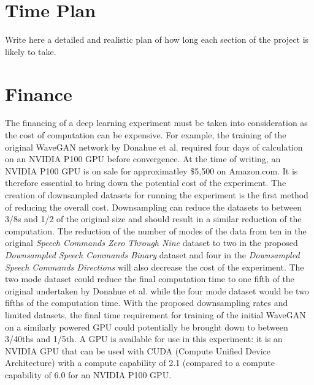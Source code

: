 \documentclass[titlepage]{article}
\begin{document}
\section{Time Plan}

Write here a detailed and realistic plan of how long each section of the project is likely to take.

\section{Finance}

The financing of a deep learning experiment must be taken into consideration as the cost of computation can be expensive.
For example, the training of the original WaveGAN network by Donahue et al. required four days of calculation on an NVIDIA P100 GPU before convergence.
At the time of writing, an NVIDIA P100 GPU is on sale for approximatley \$5,500 on Amazon.com.
It is therefore essential to bring down the potential cost of the experiment.
\newline
\newline
The creation of downsampled datasets for running the experiment is the first method of reducing the overall cost.
Downsampling can reduce the datasets to between 3/8s and 1/2 of the original size and should result in a similar reduction of the computation.
\newline
\newline
The reduction of the number of modes of the data from ten in the original \textit{Speech Commands Zero Through Nine} dataset to two in the proposed \textit{Downsampled Speech Commands Binary} dataset and four in the \textit{Downsampled Speech Commands Directions} will also decrease the cost of the experiment.
The two mode dataset could reduce the final computation time to one fifth of the original undertaken by Donahue et al. while the four mode dataset would be two fifths of the computation time.
\newline
\newline
With the proposed downsampling rates and limited datasets, the final time requirement for training of the initial WaveGAN on a similarly powered GPU could potentially be brought down to between 3/40ths and 1/5th.
\newline
\newline
A GPU is available for use in this experiment: it is an NVIDIA GPU that can be used with CUDA (Compute Unified Device Architecture) with a compute capability of 2.1 (compared to a compute capability of 6.0 for an NVIDIA P100 GPU.
\end{document}

